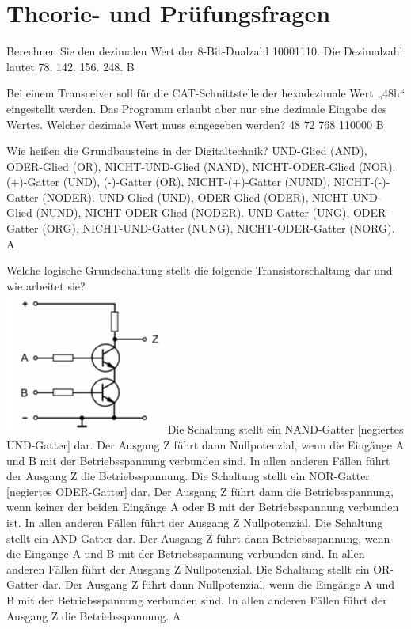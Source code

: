 
\section*{Theorie- und Prüfungsfragen} 

{Berechnen Sie den dezimalen Wert der 8-Bit-Dualzahl 10001110. Die Dezimalzahl lautet}%
{78.}%
{142.}%
{156.}%
{248.}%
{B}%

{Bei einem Transceiver soll für die CAT-Schnittstelle der hexadezimale Wert „48h“ eingestellt werden. Das Programm erlaubt aber nur eine dezimale Eingabe des Wertes. Welcher dezimale Wert muss eingegeben werden?}%
{48}%
{72}%
{768}%
{110000}%
{B}%

{Wie heißen die Grundbausteine in der Digitaltechnik?}%
{UND-Glied (AND), ODER-Glied (OR), NICHT-UND-Glied (NAND), NICHT-ODER-Glied (NOR).}%
{(+)-Gatter (UND), (-)-Gatter (OR), NICHT-(+)-Gatter (NUND), NICHT-(-)-Gatter (NODER).}%
{UND-Glied (UND), ODER-Glied (ODER), NICHT-UND-Glied (NUND), NICHT-ODER-Glied (NODER).}%
{UND-Gatter (UNG), ODER-Gatter (ORG), NICHT-UND-Gatter (NUNG), NICHT-ODER-Gatter (NORG).}%
{A}%

{Welche logische Grundschaltung stellt die folgende Transistorschaltung dar und wie arbeitet sie?\\ \includegraphics[scale=0.65]{Digitaltechnik/Bilder/TC705.png}}%
{Die Schaltung stellt ein NAND-Gatter [negiertes UND-Gatter] dar. Der Ausgang Z führt dann Nullpotenzial, wenn die Eingänge A und B mit der Betriebsspannung verbunden sind. In allen anderen Fällen führt der Ausgang Z die Betriebsspannung.}%
{Die Schaltung stellt ein NOR-Gatter [negiertes ODER-Gatter] dar. Der Ausgang Z führt dann die Betriebsspannung, wenn keiner der beiden Eingänge A oder B mit der Betriebsspannung verbunden ist. In allen anderen Fällen führt der Ausgang Z Nullpotenzial.}%
{Die Schaltung stellt ein AND-Gatter dar. Der Ausgang Z führt dann Betriebsspannung, wenn die Eingänge A und B mit der Betriebsspannung verbunden sind. In allen anderen Fällen führt der Ausgang Z Nullpotenzial.}%
{Die Schaltung stellt ein OR-Gatter dar. Der Ausgang Z führt dann Nullpotenzial, wenn die Eingänge A und B mit der Betriebsspannung verbunden sind. In allen anderen Fällen führt der Ausgang Z die Betriebsspannung.}%
{A}%

